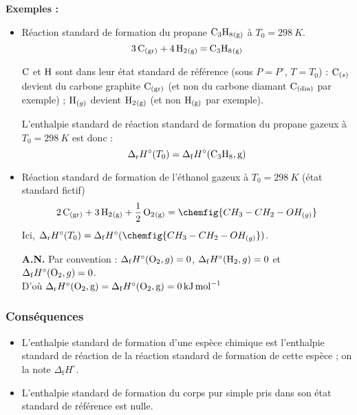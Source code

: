 \documentclass{article}
\newcommand{\Dr}{\Delta_{\mathrm{r}}}
\newcommand{\Df}{\Delta_{\mathrm{f}}}
\begin{document}
\begin{tableau}
    \textbf{Exemples :}
    \begin{itemize}
        \item Réaction standard de formation du propane\footnotemark{} $\ce{C3H8_{(g)}}$ à $T_0 = \SI{298}{K}$.
    $$\ce{3C_{(gr)} + 4H2_{(g)} = C3H8_{(g)}}$$
        \begin{attention}
            $\ce{C}$ et $\ce{H}$ sont dans leur état standard de référence (sous $P=P^\circ$, $T=T_0$) : $\ce{C}_{(s)}$ devient du carbone graphite $\ce{C_{(gr)}}$ (et non du carbone diamant $\ce{C_{(dia)}}$ par exemple) ; $\ce{H}_{(g)}$ devient $\ce{H2_{(g)}}$ (et non  $\ce{H_{(g)}}$ par exemple).
        \end{attention}
        L'enthalpie standard de réaction standard de formation du propane gazeux à $T_0 = \SI{298}{K}$ est donc :
        \begin{equation*}
            \Dr H^\circ(T_0) = \Df H^\circ (\ce{C3H8, g})
        \end{equation*}
        \item Réaction standard de formation de l'éthanol gazeux à $T_0 = \SI{298}{K}$ (état standard fictif)
        $$\ce{2C_{(gr)} + 3H2_{(g)} + 1/2 O2_{(g)}} = \chemfig{CH_3 - CH_2 - OH_{(g)}}$$
        Ici, $\Dr H^\circ (T_0) = \Df H^\circ (\chemfig{CH_3 - CH_2 - OH_{(g)}})$.
        \begin{appnum}
            \textbf{A.N.} Par convention\footnotemark{} : $\Df H^\circ(\ce{O2},g)=0$, $\Df H^\circ(\ce{H2},g)=0$ et $\Df H^\circ(\ce{O2},g)=0$.\\
            D'où $\Dr H^\circ(\ce{O2,g}) = \Df H^\circ(\ce{O2,g}) = \SI{0}{\kilo\joule\per\mole}$
        \end{appnum}
    \end{itemize}
\end{tableau}
\subsubsection{Conséquences}
\begin{itemize}
    \item L’enthalpie standard de formation d’une espèce chimique est l’enthalpie standard de réaction de la réaction standard de formation de cette espèce ; on la note $\Df H^\circ$.
\end{itemize}
\begin{enonce}
    \begin{itemize}
        \item L’enthalpie standard de formation du corps pur simple pris dans son état standard de référence est nulle.
    \end{itemize}
\end{enonce}
\end{document}

